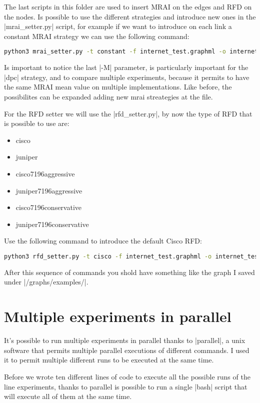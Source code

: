 \documentclass[10pt,journal,onecolumn]{IEEEtran}
\begin{document}
The last scripts in this folder are used to insert \ac{MRAI} on the edges
and \ac{RFD} on the nodes.
Is possible to use the different strategies and introduce new ones
in the |mrai_setter.py| script, for example if we want to introduce
on each link a constant \ac{MRAI} strategy we can use the following command:
\begin{lstlisting}[language=bash]
python3 mrai_setter.py -t constant -f internet_test.graphml -o internet_test.graphml -m 30 -M 30
\end{lstlisting}
Is important to notice the last |-M| parameter, is particularly important for 
the |dpc| strategy, and to compare multiple experiments, because it permits to
have the same MRAI mean value on multiple implementations.
Like before, the possibilites can be expanded adding new mrai streategies at the file.

For the \ac{RFD} setter we will use the |rfd_setter.py|, by now the type of \ac{RFD}
that is possible to use are:
\begin{itemize}
	\item cisco
	\item juniper
	\item cisco7196aggressive
	\item juniper7196aggressive
	\item cisco7196conservative
	\item juniper7196conservative
\end{itemize}
Use the following command to introduce the default Cisco \ac{RFD}:
\begin{lstlisting}[language=bash]
python3 rfd_setter.py -t cisco -f internet_test.graphml -o internet_test.graphml
\end{lstlisting}

After this sequence of commands you shold have something like the graph
I saved under |/graphs/examples/|.

\section{Multiple experiments in parallel}
\label{sec:multiple_experiments}

It's possible to run multiple experiments in parallel thanks to |parallel|, a
unix software that permits multiple parallel executions of different commands.
I used it to permit multiple different runs to be executed at the same time.

Before we wrote ten different lines of code to execute all the possible runs
of the line experiments, thanks to parallel is possible to run a single |bash|
script that will execute all of them at the same time.
\end{document}
